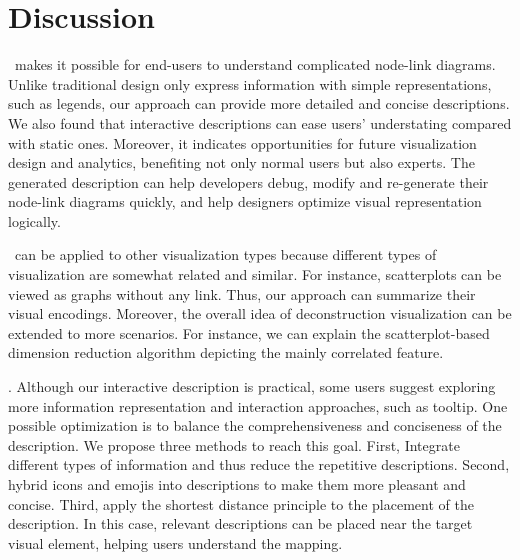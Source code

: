 \section{Discussion}

\ApproachName~makes it possible for end-users to understand complicated node-link diagrams. Unlike traditional design only express information with simple representations, such as legends, our approach can provide more detailed and concise descriptions. We also found that interactive descriptions can ease users' understating compared with static ones. Moreover, it indicates opportunities for future visualization design and analytics, benefiting not only normal users but also experts. The generated description can help developers debug, modify and re-generate their node-link diagrams quickly, and help designers optimize visual representation logically.


\ApproachName~can be applied to other visualization types because different types of visualization are somewhat related and similar. For instance, scatterplots can be viewed as graphs without any link. Thus, our approach can summarize their visual encodings. Moreover, the overall idea of deconstruction visualization can be extended to more scenarios. For instance, we can explain the scatterplot-based dimension reduction algorithm depicting the mainly correlated feature.

. 
Although our interactive description is practical, some users suggest exploring more information representation and interaction approaches, such as tooltip. One possible optimization is to balance the comprehensiveness and conciseness of the description. We propose three methods to reach this goal. First, Integrate different types of information and thus reduce the repetitive descriptions. Second, hybrid icons and emojis into descriptions to make them more pleasant and concise. Third, apply the shortest distance principle to the placement of the description. In this case, relevant descriptions can be placed near the target visual element, helping users understand the mapping.


